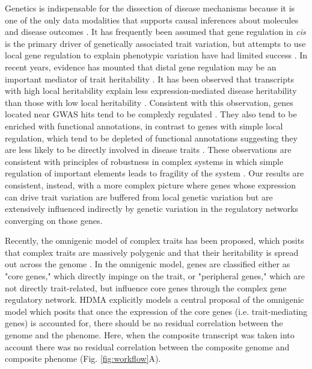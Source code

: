 Genetics is indispensable for the dissection of disease mechanisms 
because it is one of the only data modalities that supports causal 
inferences about molecules and disease outcomes \cite{pmid38632401, 
pmid27855690}. It has frequently been assumed that gene regulation in 
\textit{cis} is the primary driver of genetically associated 
trait variation, but attempts to use local gene regulation 
to explain phenotypic variation have had limited success 
\cite{pmid32912663, pmid36515579}. In recent years, evidence
has mounted that distal gene regulation may be an important
mediator of trait heritability \cite{pmid32424349, 
pmid37857933, pmid31051098}. It has been observed
that transcripts with high local heritability explain less
expression-mediated disease heritability than those
with low local heritability \cite{pmid32424349}. Consistent with
this observation, genes located near GWAS hits tend to be 
complexly regulated \cite{pmid37857933}. They also tend to be
enriched with functional annotations, in contrast to genes with
simple local regulation, which tend to be depleted of functional 
annotations suggesting they are less likely to be directly involved 
in disease traits \cite{pmid37857933}. These observations are 
consistent with principles of robustness in complex systems 
in which simple regulation of important elements leads to 
fragility of the system \cite{pmid29782925, pmid12082173, pmid27304973}.
Our results are consistent, instead, with a more complex picture 
where genes whose expression can drive trait variation are buffered 
from local genetic variation but are extensively influenced indirectly 
by genetic variation in the regulatory networks converging on those genes.

Recently, the omnigenic model of complex traits has been proposed, 
which posits that complex traits are massively polygenic and that 
their heritability is spread out across the genome \cite{pmid28622505}. 
In the omnigenic model, genes are classified either as "core genes," 
which directly impinge on the trait, or "peripheral genes," which are 
not directly trait-related, but influence core genes through the complex 
gene regulatory network. HDMA explicitly models a central proposal of 
the omnigenic model which posits that once the expression of the 
core genes (i.e. trait-mediating genes) is accounted for, there 
should be no residual correlation between the genome and the phenome. 
Here, when the composite transcript was taken into account there was 
no residual correlation between the composite genome and composite 
phenome (Fig. \ref{fig:workflow}A). 

